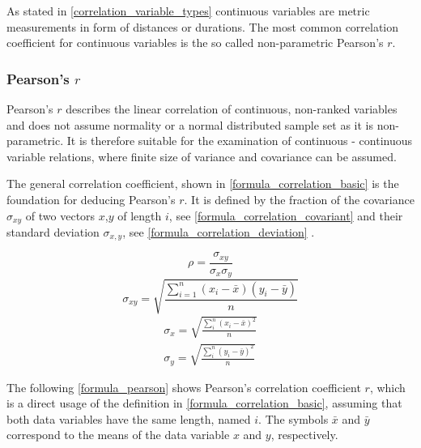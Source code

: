 As stated in \cref{correlation_variable_types} continuous variables are metric measurements in form of distances or durations. The most common correlation coefficient for continuous variables is the so called non-parametric Pearson's $r$.

\subsubsection{Pearson's $r$}
Pearson's $r$ describes the linear correlation of continuous, non-ranked variables and does not assume normality or a normal distributed sample set as it is non-parametric. It is therefore suitable for the examination of continuous - continuous variable relations, where finite size of variance and covariance can be assumed. \parencite{BenestyChenHuang2009,Sulthan2018}
 
The general correlation coefficient, shown in \cref{formula_correlation_basic} is the foundation for deducing Pearson's $r$. It is defined by the fraction of the covariance $\sigma_{xy}$ of two vectors $x$,$y$ of length $i$, see \cref{formula_correlation_covariant} and their standard deviation $\sigma_{x,y}$, see \cref{formula_correlation_deviation} \parencite{HerzSchlicherSiegener1992}.

\smallskip

\begin{equation}
	\label{formula_correlation_basic}
	\rho = \frac{\sigma_{xy}}{\sigma_{x}\sigma_{y}}
\end{equation}
\begin{equation}
	\label{formula_correlation_covariant}
	\sigma_{xy} = \sqrt{\frac{\sum_{i=1}^{n}(x_i-\bar{x})(y_i-\bar{y})}{n}}
\end{equation}
\begin{equation}
	\label{formula_correlation_deviation}
	\begin{split}
		\sigma_{x} = \sqrt{\frac{\sum_{i}^{n}(x_i-\bar{x})^2}{n}} \\ 
		\sigma_{y} = \sqrt{\frac{\sum_{i}^{n}(y_i-\bar{y})^2}{n}}
	\end{split}
\end{equation}

\bigskip

The following \cref{formula_pearson} shows Pearson's correlation coefficient $r$, which is a direct usage of the definition in \cref{formula_correlation_basic}, assuming that both data variables have the same length, named $i$. The symbols $\bar{x}$ and $\bar{y}$ correspond to the means of the data variable $x$ and $y$, respectively. \parencite{BenestyChenHuang2009,Zychlinski2018}

